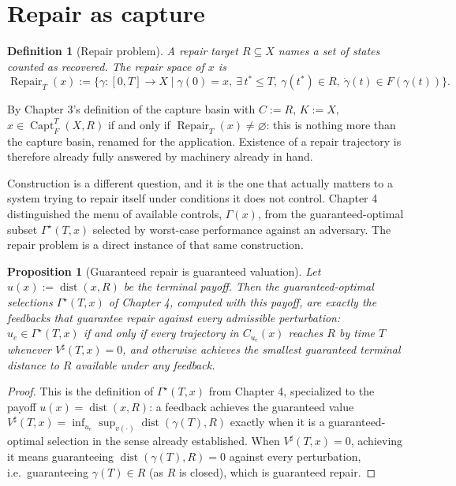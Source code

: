 \documentclass[11pt]{report}
\newtheorem{proposition}{Proposition}[chapter]
\newtheorem{definition}{Definition}[chapter]
\begin{document}
\section*{Repair as capture}

\begin{definition}[Repair problem]
A repair target $R \subseteq X$ names a set of states counted as
recovered. The repair space of $x$ is
\[
\operatorname{Repair}_T(x) := \{ \gamma : [0,T] \to X \mid \gamma(0) = x,\ \exists\, t^\ast \leq T,\ \gamma(t^\ast) \in R,\ \dot\gamma(t) \in F(\gamma(t)) \}.
\]
\end{definition}

By Chapter 3's definition of the capture basin with $C := R$, $K := X$,
$x \in \operatorname{Capt}_F^T(X,R)$ if and only if
$\operatorname{Repair}_T(x) \neq \varnothing$: this is nothing more than
the capture basin, renamed for the application. Existence of a repair
trajectory is therefore already fully answered by machinery already in
hand.

Construction is a different question, and it is the one that actually
matters to a system trying to repair itself under conditions it does
not control. Chapter 4 distinguished the menu of available controls,
$\Gamma(x)$, from the guaranteed-optimal subset $\Gamma^\star(T,x)$
selected by worst-case performance against an adversary. The repair
problem is a direct instance of that same construction.

\begin{proposition}[Guaranteed repair is guaranteed valuation]
Let $u(x) := \operatorname{dist}(x, R)$ be the terminal payoff. Then
the guaranteed-optimal selections $\Gamma^\star(T,x)$ of Chapter 4,
computed with this payoff, are exactly the feedbacks that guarantee
repair against every admissible perturbation: $u_e \in \Gamma^\star(T,x)$
if and only if every trajectory in $C_{u_e}(x)$ reaches $R$ by time $T$
whenever $V^\sharp(T,x) = 0$, and otherwise achieves the smallest
guaranteed terminal distance to $R$ available under any feedback.
\end{proposition}
\begin{proof}
This is the definition of $\Gamma^\star(T,x)$ from Chapter 4, specialized
to the payoff $u(x) = \operatorname{dist}(x,R)$: a feedback achieves the
guaranteed value $V^\sharp(T,x) = \inf_{u_e} \sup_{v(\cdot)} \operatorname{dist}(\gamma(T), R)$
exactly when it is a guaranteed-optimal selection in the sense already
established. When $V^\sharp(T,x) = 0$, achieving it means guaranteeing
$\operatorname{dist}(\gamma(T),R) = 0$ against every perturbation, i.e.\
guaranteeing $\gamma(T) \in R$ (as $R$ is closed), which is guaranteed
repair.
\end{proof}
\end{document}
